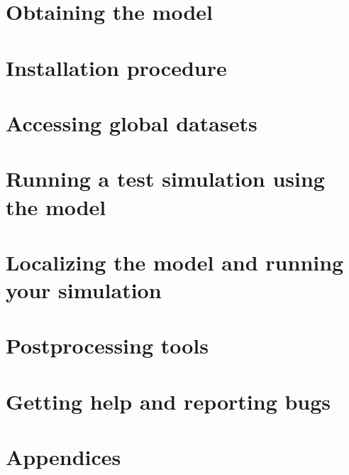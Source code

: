 \documentclass[10pt,twoside,a4paper]{report}
\begin{document}
\chapter{Obtaining the model}


\chapter{Installation procedure}
\label{install}

\newpage

\chapter{Accessing global datasets}
\label{obdata}

\newpage

\chapter{Running a test simulation using the model}
\label{tutorial}

\newpage

\chapter{Localizing the model and running your simulation}
\label{advanced}

\newpage

\chapter{Postprocessing tools}
\label{postproc}

\newpage

\chapter{Getting help and reporting bugs}
\label{tracker}

\newpage

\cleardoublepage

\chapter{Appendices}
\label{Appendice}


\newpage




\cleardoublepage

\evensidemargin=1.0cm
\oddsidemargin=1.5cm
\end{document}
